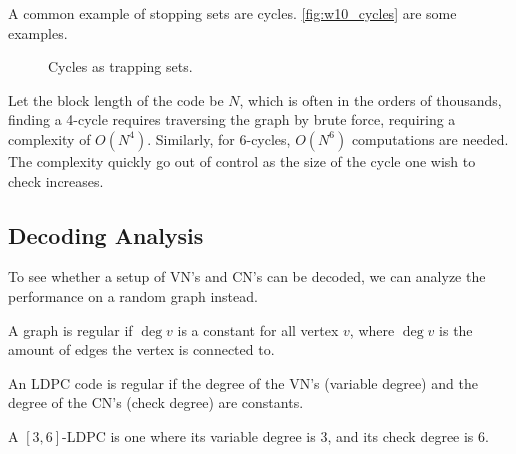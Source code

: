 \begin{example}
    A common example of stopping sets are cycles. \autoref{fig:w10_cycles} are some examples.
    \begin{figure}[H]
        \centering
        \hspace{1cm}
        \caption{Cycles as trapping sets.}
        \label{fig:w10_cycles}
    \end{figure}
    Let the block length of the code be $N$, which is often in the orders of thousands, finding a 4-cycle requires traversing the graph by brute force, requiring a complexity of $O(N^4)$. Similarly, for 6-cycles, $O(N^6)$ computations are needed. The complexity quickly go out of control as the size of the cycle one wish to check increases.
\end{example}


\subsection{Decoding Analysis}
To see whether a setup of VN's and CN's can be decoded, we can analyze the performance on a random graph instead.

\begin{definition}
    A graph is regular if $\deg v$ is a constant for all vertex $v$, where $\deg v$ is the amount of edges the vertex is connected to.
\end{definition}

\begin{definition}
    An LDPC code is regular if the degree of the VN's (variable degree) and the degree of the CN's (check degree) are constants.
\end{definition}

\begin{example}
    A $[3,6]$-LDPC is one where its variable degree is 3, and its check degree is 6.
\end{example}


